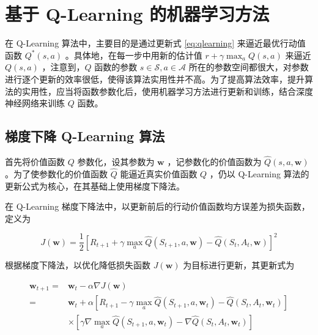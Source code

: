 \chapter{基于 Q-Learning 的机器学习方法}

在 Q-Learning 算法中，主要目的是通过更新式 \ref{eq:qlearning} 来逼近最优行动值函数 $Q^*(s,a)$ 。具体地，在每一步中用新的估计值 $r+\gamma \max_aQ(s,a)$ 来逼近 $Q(s,a)$ ，注意到，$Q$ 函数的参数 $s\in\mathcal S, a\in\mathcal A$ 所在的参数空间都很大，对参数进行逐个更新的效率很低，使得该算法实用性并不高。为了提高算法效率，提升算法的实用性，应当将函数参数化后，使用机器学习方法进行更新和训练，结合深度神经网络\cite{goodfellow2016deep}\cite{bishop2006pattern}\cite{murphy2012machine}来训练 $Q$ 函数。

\section{梯度下降 Q-Learning 算法}

首先将价值函数 $Q$ 参数化，设其参数为 $\boldsymbol{w}$ ，记参数化的价值函数为 $\widehat{Q}(s,a,\boldsymbol{w})$。为了使参数化的价值函数 $\widehat{Q}$ 能逼近真实价值函数 $Q$ ，仍以 Q-Learning 算法的更新公式为核心，在其基础上使用梯度下降法\cite{tsitsiklis1997analysis}\cite{bottou2010large}\cite{sutton2009fast}。

在 Q-Learning 梯度下降法中，以更新前后的行动价值函数均方误差为损失函数，定义为

\begin{equation}
    J(\boldsymbol{w}) = \frac{1}{2}\left[R_{t+1}+\gamma\max_a\widehat{Q}(S_{t+1},a,\boldsymbol{w})-\widehat{Q}(S_t,A_t,\boldsymbol{w})\right]^2
\end{equation}

根据梯度下降法，以优化降低损失函数 $J(\boldsymbol{w})$ 为目标进行更新，其更新式为

\begin{equation}\label{eq:qlearninggrad}
\begin{aligned} \boldsymbol{w}_{t+1} =&\boldsymbol{w}_{t}-\alpha\nabla J(\boldsymbol{w}) \\ =&\boldsymbol{w}_{t}+\alpha\left[R_{t+1} - \gamma \max _{a} \widehat{Q}\left(S_{t+1}, a, \boldsymbol{w}_{t}\right)-\widehat{Q}\left(S_{t}, A_{t}, \boldsymbol{w}_{t}\right)\right]\\&\times\left[\gamma\nabla \max _{a} \widehat{Q}\left(S_{t+1}, a, \boldsymbol{w}_{t}\right)-\nabla \widehat{Q}\left(S_{t}, A_{t}, \boldsymbol{w}_{t}\right)\right] \end{aligned}
\end{equation}


